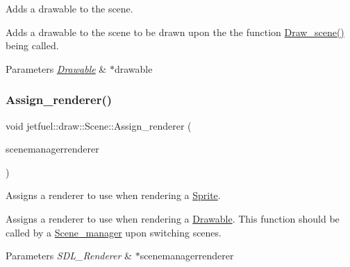 Adds a drawable to the scene. 

Adds a drawable to the scene to be drawn upon the the function \hyperlink{classjetfuel_1_1draw_1_1Scene_a80b9b5f38022b6c2af9921656f93056b}{Draw\+\_\+scene()} being called.


\begin{DoxyParams}{Parameters}
{\em \hyperlink{classjetfuel_1_1draw_1_1Drawable}{Drawable}} & $\ast$drawable \\
\hline
\end{DoxyParams}
\mbox{\label{classjetfuel_1_1draw_1_1Scene_a0cd111e8863ab2e9e78cd3b6144c64a8}} 
\subsubsection{\texorpdfstring{Assign\+\_\+renderer()}{Assign\_renderer()}}
{\footnotesize\ttfamily void jetfuel\+::draw\+::\+Scene\+::\+Assign\+\_\+renderer (\begin{DoxyParamCaption}\item[{S\+D\+L\+\_\+\+Renderer $\ast$}]{scenemanagerrenderer }\end{DoxyParamCaption})\hspace{0.3cm}{\ttfamily [inline]}}



Assigns a renderer to use when rendering a \hyperlink{classjetfuel_1_1draw_1_1Sprite}{Sprite}. 

Assigns a renderer to use when rendering a \hyperlink{classjetfuel_1_1draw_1_1Drawable}{Drawable}. This function should be called by a \hyperlink{classjetfuel_1_1draw_1_1Scene__manager}{Scene\+\_\+manager} upon switching scenes.


\begin{DoxyParams}{Parameters}
{\em S\+D\+L\+\_\+\+Renderer} & $\ast$scenemanagerrenderer \\
\hline
\end{DoxyParams}
\mbox{\label{classjetfuel_1_1draw_1_1Scene_aea4b4c4ae25c30d661be4c52787e0ea3}} 
